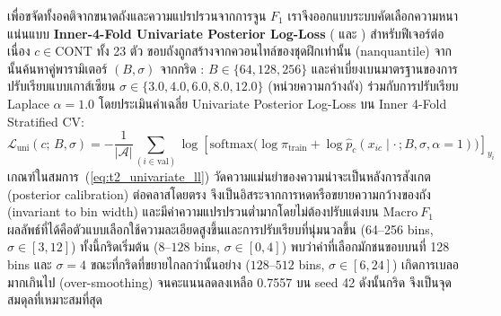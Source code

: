 เพื่อขจัดทั้งอคติจากขนาดถังและความแปรปรวนจากการจูน $F_1$ เราจึงออกแบบระบบคัดเลือกความหนาแน่นแบบ \textbf{Inner-4-Fold Univariate Posterior Log-Loss} ( และ ) สำหรับฟีเจอร์ต่อเนื่อง $c \in \mathrm{CONT}$ ทั้ง 23 ตัว ขอบถังถูกสร้างจากควอนไทล์ของชุดฝึกเท่านั้น ($\mathrm{nanquantile}$) จากนั้นค้นหาคู่พารามิเตอร์ $(B, \sigma)$ จากกริด : $B \in \{64, 128, 256\}$ และค่าเบี่ยงเบนมาตรฐานของการปรับเรียบแบบเกาส์เซียน $\sigma \in \{3.0, 4.0, 6.0, 8.0, 12.0\}$ (หน่วยความกว้างถัง) ร่วมกับการปรับเรียบ Laplace $\alpha = 1.0$ โดยประเมินค่าเฉลี่ย Univariate Posterior Log-Loss บน Inner 4-Fold Stratified CV:
\begin{equation}
\label{eq:t2_univariate_ll}
\mathcal{L}_{\mathrm{uni}}(c;\, B, \sigma) = -\frac{1}{|\mathcal{A}|}\sum_{(i \in \text{val})} \log \left[ \mathrm{softmax}\Big(\log \hat{\pi}_{\mathrm{train}} + \log \hat{p}_c(x_{ic} \mid \cdot\,; B, \sigma, \alpha=1)\Big) \right]_{y_i}
\end{equation}
เกณฑ์ในสมการ~(\ref{eq:t2_univariate_ll}) วัดความแม่นยำของความน่าจะเป็นหลังการสังเกต (posterior calibration) ต่อคลาสโดยตรง จึงเป็นอิสระจากการหดหรือขยายความกว้างของถัง (invariant to bin width) และมีค่าความแปรปรวนต่ำมากโดยไม่ต้องปรับแต่งบน $\mathrm{Macro}\ F_1$ ผลลัพธ์ที่ได้คือตัวแบบเลือกใช้ความละเอียดสูงขึ้นและการปรับเรียบที่นุ่มนวลขึ้น (64--256 bins, $\sigma \in [3, 12]$) ทั้งนี้กริดเริ่มต้น  ($8\text{--}128$ bins, $\sigma \in [0, 4]$) พบว่าค่าที่เลือกมักชนขอบบนที่ 128 bins และ $\sigma=4$ ขณะที่กริดที่ขยายไกลกว่านั้นอย่าง  ($128\text{--}512$ bins, $\sigma \in [6, 24]$) เกิดการเบลอมากเกินไป (over-smoothing) จนคะแนนลดลงเหลือ 0.7557 บน seed 42 ดังนั้นกริด  จึงเป็นจุดสมดุลที่เหมาะสมที่สุด

